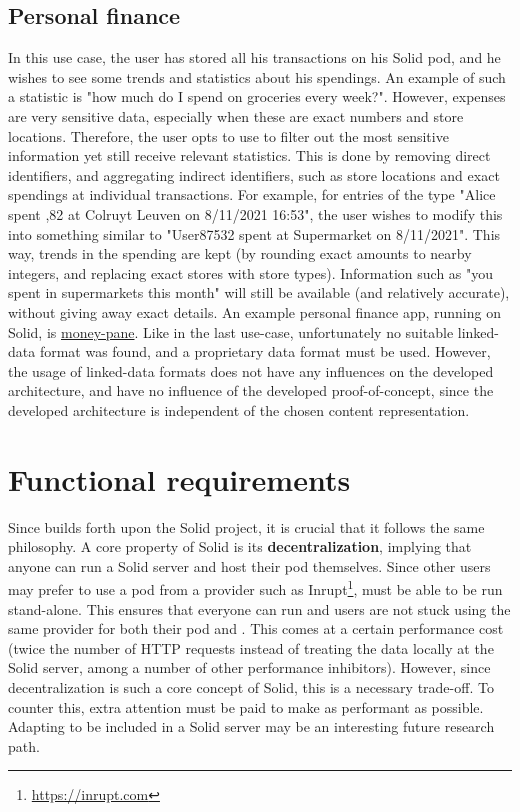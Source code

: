 \subsection{Personal finance}
In this use case, the user has stored all his transactions on his Solid pod, and he wishes to see some trends and statistics about his spendings. An example of such a statistic is "how much do I spend on groceries every week?".  However, expenses are very sensitive data, especially when these are exact numbers and store locations. Therefore, the user opts to use \middleware{} to filter out the most sensitive information yet still receive relevant statistics. This is done by removing direct identifiers, and aggregating indirect identifiers, such as store locations and exact spendings at individual transactions.  For example, for entries of the type "Alice spent ,82 at Colruyt Leuven on 8/11/2021 16:53", the user wishes to modify this into something similar to "User87532 spent  at Supermarket on 8/11/2021". This way, trends in the spending are kept (by rounding exact amounts to nearby integers, and replacing exact stores with store types). Information such as "you spent  in supermarkets this month" will still be available (and relatively accurate), without giving away exact details. An example personal finance app, running on Solid, is \href{https://github.com/solid/money-pane}{money-pane}. Like in the last use-case, unfortunately no suitable linked-data format was found, and a proprietary data format must be used. 
However, the usage of linked-data formats does not have any influences on the developed architecture, and have no influence of the developed proof-of-concept, since the developed architecture is independent of the chosen content representation.

\section{Functional requirements}
Since \middleware{} builds forth upon the Solid project, it is crucial that it follows the same philosophy. A core property of Solid is its \textbf{decentralization}, implying that anyone can run a Solid server and host their pod themselves. Since other users may prefer to use a pod from a provider such as Inrupt\footnote{\url{https://inrupt.com}}, \middleware{} must be able to be run stand-alone. This ensures that everyone can run \middleware{} and users are not stuck using the same provider for both their pod and \middleware{}. This comes at a certain performance cost (twice the number of HTTP requests instead of treating the data locally at the Solid server, among a number of other performance inhibitors). However, since decentralization is such a core concept of Solid, this is a necessary trade-off. To counter this, extra attention must be paid to make \middleware{} as performant as possible. Adapting \middleware{} to be included in a Solid server may be an interesting future research path. 

